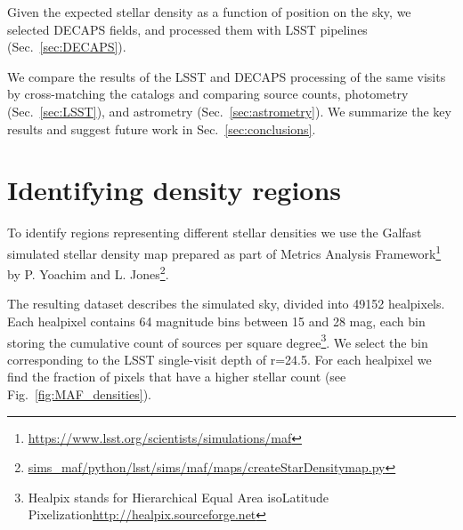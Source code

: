 \documentclass[DM,lsstdraft,toc,usenatbib]{lsstdoc}
\begin{document}
Given the expected stellar density as a function of position on the sky, we selected DECAPS fields, and processed them with LSST pipelines (Sec.~\ref{sec:DECAPS}). 

We compare the results of the LSST and DECAPS processing of the same visits by cross-matching the catalogs and comparing source counts, photometry (Sec.~\ref{sec:LSST}), and astrometry (Sec.~\ref{sec:astrometry}). We summarize the key results and suggest future work in Sec.~\ref{sec:conclusions}. 




\section{Identifying density regions}
\label{sec:MAF}
To identify regions representing different stellar densities we use the Galfast simulated stellar density map  
prepared as part of Metrics Analysis Framework\footnote{\url{https://www.lsst.org/scientists/simulations/maf}} by P. Yoachim and L. Jones\footnote{\url{sims_maf/python/lsst/sims/maf/maps/createStarDensitymap.py}}.

The  resulting dataset describes the simulated sky, divided into 49152 healpixels. Each healpixel contains 64 magnitude bins between 15 and 28 mag, each bin storing the cumulative count of sources per square degree\footnote{Healpix stands for Hierarchical Equal Area isoLatitude Pixelization\url{http://healpix.sourceforge.net}\citep{gorski2005}}. We select the bin corresponding to the LSST single-visit depth of r=24.5. For each healpixel we find the fraction of pixels that have a higher stellar count (see Fig.~\ref{fig:MAF_densities}).
\end{document}
